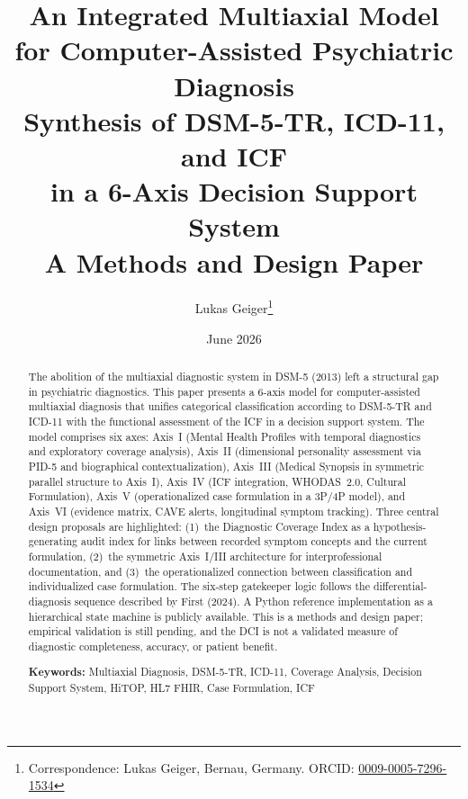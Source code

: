 \documentclass[11pt,a4paper]{article}
\begin{document}
\title{\textbf{\huge An Integrated Multiaxial Model\\for Computer-Assisted Psychiatric Diagnosis}\\[0.5em]
\Large Synthesis of DSM-5-TR, ICD-11, and ICF\\in a 6-Axis Decision Support System\\[0.3em]
\large A Methods and Design Paper}

\author[1]{Lukas Geiger\thanks{Correspondence: Lukas Geiger, Bernau, Germany. ORCID: \href{https://orcid.org/0009-0005-7296-1534}{0009-0005-7296-1534}}}

\date{June 2026}

\maketitle

\begin{abstract}
\noindent The abolition of the multiaxial diagnostic system in DSM-5 (2013) left a structural gap in psychiatric diagnostics. This paper presents a 6-axis model for computer-assisted multiaxial diagnosis that unifies categorical classification according to DSM-5-TR and ICD-11 with the functional assessment of the ICF in a decision support system. The model comprises six axes: Axis~I (Mental Health Profiles with temporal diagnostics and exploratory coverage analysis), Axis~II (dimensional personality assessment via PID-5 and biographical contextualization), Axis~III (Medical Synopsis in symmetric parallel structure to Axis~I), Axis~IV (ICF integration, WHODAS~2.0, Cultural Formulation), Axis~V (operationalized case formulation in a 3P/4P model), and Axis~VI (evidence matrix, CAVE alerts, longitudinal symptom tracking). Three central design proposals are highlighted: (1)~the Diagnostic Coverage Index as a hypothesis-generating audit index for links between recorded symptom concepts and the current formulation, (2)~the symmetric Axis~I/III architecture for interprofessional documentation, and (3)~the operationalized connection between classification and individualized case formulation. The six-step gatekeeper logic follows the differential-diagnosis sequence described by First (2024). A Python reference implementation as a hierarchical state machine is publicly available. This is a methods and design paper; empirical validation is still pending, and the DCI is not a validated measure of diagnostic completeness, accuracy, or patient benefit.

\vspace{0.5em}
\noindent \textbf{Keywords:} Multiaxial Diagnosis, DSM-5-TR, ICD-11, Coverage Analysis, Decision Support System, HiTOP, HL7 FHIR, Case Formulation, ICF
\end{abstract}
\end{document}
